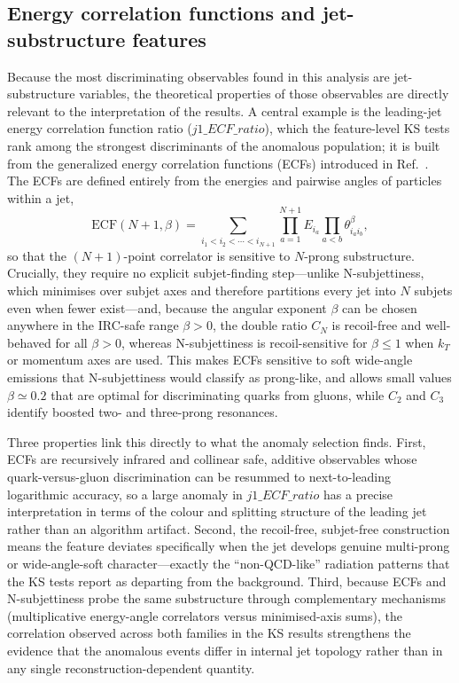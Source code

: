 \documentclass[11pt,a4paper,twocolumn]{article}
\begin{document}
\subsection{Energy correlation functions and jet-substructure features}
\label{sec:lit-ecf}

Because the most discriminating observables found in this analysis are jet-substructure variables, the theoretical properties of those observables are directly relevant to the interpretation of the results. A central example is the leading-jet energy correlation function ratio ($j1\_ECF\_ratio$), which the feature-level KS tests rank among the strongest discriminants of the anomalous population; it is built from the generalized energy correlation functions (ECFs) introduced in Ref.~\cite{Larkoski2013ECF}. The ECFs are defined entirely from the energies and pairwise angles of particles within a jet,
\begin{equation*}
\mathrm{ECF}(N+1,\beta)=\sum_{i_1<i_2<\cdots<i_{N+1}}\prod_{a=1}^{N+1} E_{i_a}\prod_{a<b}\theta_{i_a i_b}^{\beta},
\end{equation*}
so that the $(N{+}1)$-point correlator is sensitive to $N$-prong substructure. Crucially, they require no explicit subjet-finding step---unlike N-subjettiness, which minimises over subjet axes and therefore partitions every jet into $N$ subjets even when fewer exist---and, because the angular exponent $\beta$ can be chosen anywhere in the IRC-safe range $\beta>0$, the double ratio $C_N$ is recoil-free and well-behaved for all $\beta>0$, whereas N-subjettiness is recoil-sensitive for $\beta\le 1$ when $k_T$ or momentum axes are used. This makes ECFs sensitive to soft wide-angle emissions that N-subjettiness would classify as prong-like, and allows small values $\beta\simeq 0.2$ that are optimal for discriminating quarks from gluons, while $C_2$ and $C_3$ identify boosted two- and three-prong resonances.

Three properties link this directly to what the anomaly selection finds. First, ECFs are recursively infrared and collinear safe, additive observables whose quark-versus-gluon discrimination can be resummed to next-to-leading logarithmic accuracy, so a large anomaly in $j1\_ECF\_ratio$ has a precise interpretation in terms of the colour and splitting structure of the leading jet rather than an algorithm artifact. Second, the recoil-free, subjet-free construction means the feature deviates specifically when the jet develops genuine multi-prong or wide-angle-soft character---exactly the ``non-QCD-like'' radiation patterns that the KS tests report as departing from the background. Third, because ECFs and N-subjettiness probe the same substructure through complementary mechanisms (multiplicative energy-angle correlators versus minimised-axis sums), the correlation observed across both families in the KS results strengthens the evidence that the anomalous events differ in internal jet topology rather than in any single reconstruction-dependent quantity.
\end{document}
